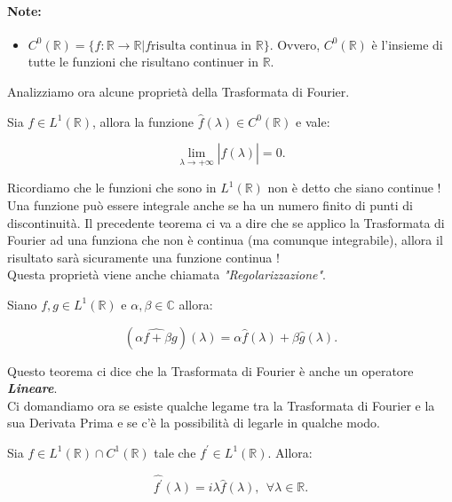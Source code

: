 \paragraph{Note:}
\begin{itemize}
    \item $C^0(\mathbb{R}) = \{ f: \mathbb{R} \rightarrow \mathbb{R} | f \text{
                  risulta continua in } \mathbb{R} \}$. Ovvero, $C^0(\mathbb{R})$ è
          l'insieme di tutte le funzioni che risultano continuer in
          $\mathbb{R}$.
\end{itemize}

Analizziamo ora alcune proprietà della Trasformata di Fourier.

\begin{theorem}
    Sia $f \in L^1(\mathbb{R})$, allora la funzione $\hat{f}(\lambda) \in
        C^0(\mathbb{R})$ e vale:

    $$
        \lim_{\lambda \rightarrow +\infty} \left| \hat{f}(\lambda) \right| = 0.
    $$
\end{theorem}

Ricordiamo che le funzioni che sono in $L^1(\mathbb{R})$ non è detto che siano
continue ! Una funzione può essere integrale anche se ha un numero finito di
punti di discontinuità. Il precedente teorema ci va a dire che se applico la
Trasformata di Fourier ad una funziona che non è continua (ma comunque
integrabile), allora il risultato sarà sicuramente una funzione continua !\\
Questa proprietà viene anche chiamata \textit{"Regolarizzazione"}.

\begin{theorem}
    Siano $f, g \in L^1(\mathbb{R})$ e $\alpha, \beta \in \mathbb{C}$ allora:

    $$
        (\widehat{ \alpha f + \beta g })(\lambda) = \alpha \hat{f}(\lambda) +
        \beta \hat{g}(\lambda).
    $$
\end{theorem}

Questo teorema ci dice che la Trasformata di Fourier è anche un operatore
\textbf{\textit{Lineare}}.\\

Ci domandiamo ora se esiste qualche legame tra la Trasformata di Fourier e la
sua Derivata Prima e se c'è la possibilità di legarle in qualche modo.

\begin{theorem}
    Sia $f \in L^1(\mathbb{R}) \cap C^1(\mathbb{R})$ tale che $f^{\prime} \in
        L^1(\mathbb{R})$. Allora:

    $$
        \widehat{f^{\prime}}(\lambda) = i \lambda \hat{f}(\lambda), \ \ \forall
        \lambda \in \mathbb{R}.
    $$
\end{theorem}


